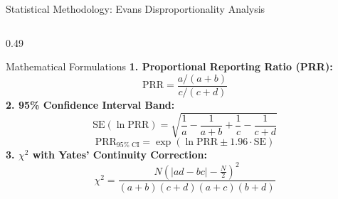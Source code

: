 \documentclass[11pt, aspectratio=169]{beamer}
\begin{document}
\begin{frame}{Statistical Methodology: Evans Disproportionality Analysis}
\begin{columns}[T]
        \begin{column}{0.49\textwidth}
            \begin{block}{\footnotesize Mathematical Formulations}
                \scriptsize
                \textbf{1. Proportional Reporting Ratio (PRR):}
                \vspace{-0.15cm}
                \[ \text{PRR} = \frac{a / (a + b)}{c / (c + d)} \]
                \textbf{2. 95\% Confidence Interval Band:}
                \vspace{-0.15cm}
                {\scriptsize
                \[ \text{SE}(\ln \text{PRR}) = \sqrt{\frac{1}{a} - \frac{1}{a + b} + \frac{1}{c} - \frac{1}{c + d}} \]
                \[ \text{PRR}_{95\%\text{ CI}} = \exp\left(\ln \text{PRR} \pm 1.96 \cdot \text{SE}\right) \]
                }
                \textbf{3. $\chi^2$ with Yates' Continuity Correction:}
                \vspace{-0.15cm}
                {\scriptsize \[ \chi^2 = \frac{N \left( |a d - b c| - \frac{N}{2} \right)^2}{(a + b)(c + d)(a + c)(b + d)} \]}
            \end{block}
        \end{column}
    \end{columns}
\end{frame}
\end{document}
